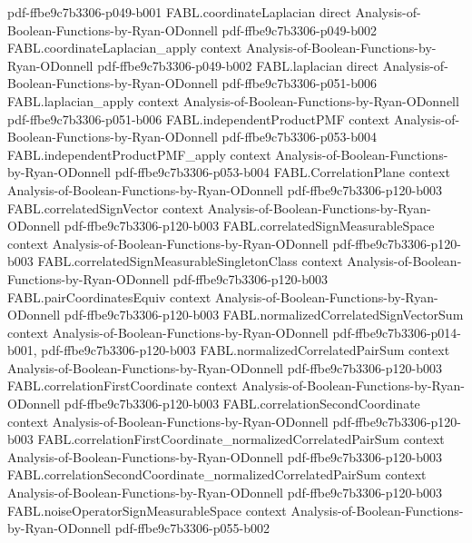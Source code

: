 \begin{theorem}
  {pdf-ffbe9c7b3306-p049-b001}
\proofstep
  {FABL.coordinateLaplacian}
  {direct}
  {Analysis-of-Boolean-Functions-by-Ryan-ODonnell}
  {pdf-ffbe9c7b3306-p049-b002}
\proofstep
  {FABL.coordinateLaplacian_apply}
  {context}
  {Analysis-of-Boolean-Functions-by-Ryan-ODonnell}
  {pdf-ffbe9c7b3306-p049-b002}
\proofstep
  {FABL.laplacian}
  {direct}
  {Analysis-of-Boolean-Functions-by-Ryan-ODonnell}
  {pdf-ffbe9c7b3306-p051-b006}
\proofstep
  {FABL.laplacian_apply}
  {context}
  {Analysis-of-Boolean-Functions-by-Ryan-ODonnell}
  {pdf-ffbe9c7b3306-p051-b006}
\proofstep
  {FABL.independentProductPMF}
  {context}
  {Analysis-of-Boolean-Functions-by-Ryan-ODonnell}
  {pdf-ffbe9c7b3306-p053-b004}
\proofstep
  {FABL.independentProductPMF_apply}
  {context}
  {Analysis-of-Boolean-Functions-by-Ryan-ODonnell}
  {pdf-ffbe9c7b3306-p053-b004}
\proofstep
  {FABL.CorrelationPlane}
  {context}
  {Analysis-of-Boolean-Functions-by-Ryan-ODonnell}
  {pdf-ffbe9c7b3306-p120-b003}
\proofstep
  {FABL.correlatedSignVector}
  {context}
  {Analysis-of-Boolean-Functions-by-Ryan-ODonnell}
  {pdf-ffbe9c7b3306-p120-b003}
\proofstep
  {FABL.correlatedSignMeasurableSpace}
  {context}
  {Analysis-of-Boolean-Functions-by-Ryan-ODonnell}
  {pdf-ffbe9c7b3306-p120-b003}
\proofstep
  {FABL.correlatedSignMeasurableSingletonClass}
  {context}
  {Analysis-of-Boolean-Functions-by-Ryan-ODonnell}
  {pdf-ffbe9c7b3306-p120-b003}
\proofstep
  {FABL.pairCoordinatesEquiv}
  {context}
  {Analysis-of-Boolean-Functions-by-Ryan-ODonnell}
  {pdf-ffbe9c7b3306-p120-b003}
\proofstep
  {FABL.normalizedCorrelatedSignVectorSum}
  {context}
  {Analysis-of-Boolean-Functions-by-Ryan-ODonnell}
  {pdf-ffbe9c7b3306-p014-b001,
    pdf-ffbe9c7b3306-p120-b003}
\proofstep
  {FABL.normalizedCorrelatedPairSum}
  {context}
  {Analysis-of-Boolean-Functions-by-Ryan-ODonnell}
  {pdf-ffbe9c7b3306-p120-b003}
\proofstep
  {FABL.correlationFirstCoordinate}
  {context}
  {Analysis-of-Boolean-Functions-by-Ryan-ODonnell}
  {pdf-ffbe9c7b3306-p120-b003}
\proofstep
  {FABL.correlationSecondCoordinate}
  {context}
  {Analysis-of-Boolean-Functions-by-Ryan-ODonnell}
  {pdf-ffbe9c7b3306-p120-b003}
\proofstep
  {FABL.correlationFirstCoordinate_normalizedCorrelatedPairSum}
  {context}
  {Analysis-of-Boolean-Functions-by-Ryan-ODonnell}
  {pdf-ffbe9c7b3306-p120-b003}
\proofstep
  {FABL.correlationSecondCoordinate_normalizedCorrelatedPairSum}
  {context}
  {Analysis-of-Boolean-Functions-by-Ryan-ODonnell}
  {pdf-ffbe9c7b3306-p120-b003}
\proofstep
  {FABL.noiseOperatorSignMeasurableSpace}
  {context}
  {Analysis-of-Boolean-Functions-by-Ryan-ODonnell}
  {pdf-ffbe9c7b3306-p055-b002}

\end{theorem}

